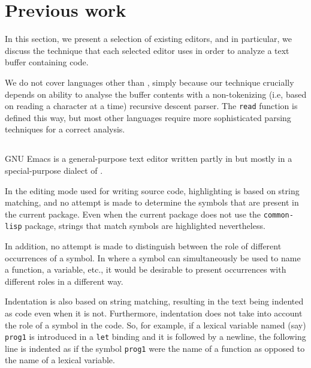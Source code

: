 \section{Previous work}

In this section, we present a selection of existing editors, and in
particular, we discuss the technique that each selected editor uses in
order to analyze a text buffer containing \commonlisp{} code.

We do not cover languages other than \commonlisp{}, simply because our
technique crucially depends on ability to analyse the buffer contents
with a non-tokenizing (i.e, based on reading a character at a time)
recursive descent parser.  The \commonlisp{} \texttt{read} function is
defined this way, but most other languages require more sophisticated
parsing techniques for a correct analysis.

\subsection{\emacs{}}
\label{sec-previous-emacs}

GNU Emacs \cite{Finseth:1980:TPTa,CraftOfTextEditiing} is a
general-purpose text editor written partly in \clanguage{} but mostly
in a special-purpose dialect of \lisp{}
\cite{GNUEmacsLispReferenceManual}.

In the editing mode used for writing \commonlisp{} source code,
highlighting is based on string matching, and no attempt is made to
determine the symbols that are present in the current package.  Even
when the current package does not use the \texttt{common-lisp}
package, strings that match \commonlisp{} symbols are highlighted
nevertheless.

In addition, no attempt is made to distinguish between the role of
different occurrences of a symbol.  In \commonlisp{} where a symbol
can simultaneously be used to name a function, a variable, etc., it
would be desirable to present occurrences with different roles in a
different way.

Indentation is also based on string matching, resulting in the text
being indented as \commonlisp{} code even when it is not.
Furthermore, indentation does not take into account the role of a
symbol in the code.  So, for example, if a lexical variable named
(say) \texttt{prog1} is introduced in a \texttt{let} binding and
it is followed by a newline, the following line is indented as if the
symbol \texttt{prog1} were the name of a \commonlisp{} function as
opposed to the name of a lexical variable.

